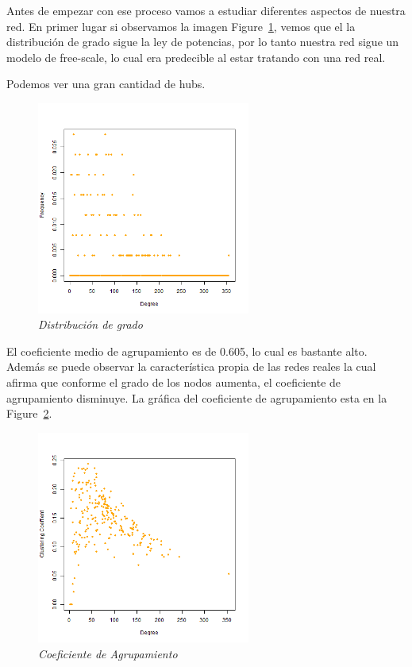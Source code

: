 Antes de empezar con ese proceso vamos a estudiar diferentes aspectos de nuestra red. En primer lugar si observamos la imagen Figure~\ref{degree}, vemos que el la distribución de grado sigue la ley de potencias, por lo tanto nuestra red sigue un modelo de free-scale, lo cual era predecible al estar tratando con una red real. 

Podemos  ver una gran cantidad de hubs.

\begin{figure}[h]
	\centering
		\includegraphics[width=70mm,scale=1.2]{figures/degree_distribution.png}
		\caption{\textit{Distribución de grado}}
	    \label{degree}
\end{figure}

El coeficiente medio de agrupamiento es de 0.605, lo cual es bastante alto. Además se puede observar la característica propia de las redes reales la cual afirma que conforme el grado de los nodos aumenta, el coeficiente de agrupamiento disminuye. La gráfica del coeficiente de agrupamiento esta en la Figure~\ref{coefclust}.

\begin{figure}[h]
	\centering
		\includegraphics[width=70mm,scale=1.2]{figures/coeficiente_agrupamiento.png}
		\caption{\textit{Coeficiente de Agrupamiento}}
		\label{coefclust}
\end{figure}

